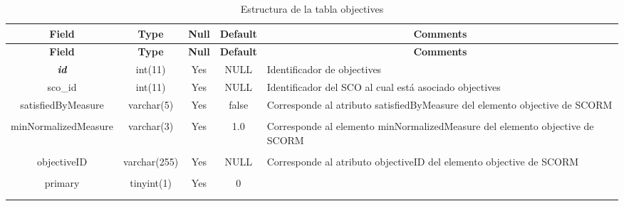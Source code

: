 %
%
\begin{longtable}{c c c c l}
	\multicolumn{1}{c}{\textbf{Field}} &
	\multicolumn{1}{c}{\textbf{Type}} &
	\multicolumn{1}{c}{\textbf{Null}} &
	\multicolumn{1}{c}{\textbf{Default}} &
	\multicolumn{1}{c}{\textbf{Comments}} \\ \hline \hline
\endfirsthead
	\multicolumn{1}{c}{\textbf{Field}} &
	\multicolumn{1}{c}{\textbf{Type}} &
	\multicolumn{1}{c}{\textbf{Null}} &
	\multicolumn{1}{c}{\textbf{Default}} &
	\multicolumn{1}{c}{\textbf{Comments}} \\ \hline \hline
\endhead \endfoot
	\textbf{\textit{id}} & int(11) & Yes & NULL & \parbox[t]{0.35\textwidth}{Identificador de objectives}\\ \hline 
	sco\_id & int(11) & Yes & NULL & \parbox[t]{0.35\textwidth}{Identificador del SCO al cual está asociado objectives}\\ \hline 
	satisfiedByMeasure & varchar(5) & Yes & false & \parbox[t]{0.35\textwidth}{Corresponde al atributo satisfiedByMeasure del elemento objective de SCORM} \\ \\  \hline
	minNormalizedMeasure & varchar(3) & Yes & 1.0 & \parbox[t]{0.35\textwidth}{Corresponde al elemento minNormalizedMeasure del elemento objective de SCORM} \\ \\  \hline
	objectiveID & varchar(255) & Yes & NULL & \parbox[t]{0.35\textwidth}{Corresponde al atributo objectiveID del elemento objective de SCORM} \\ \\  \hline
	primary & tinyint(1) & Yes & 0 \\ \\ 
 \caption{Estructura de la tabla objectives} \label{tab:scorm_objectives-structure} \\
\end{longtable}


